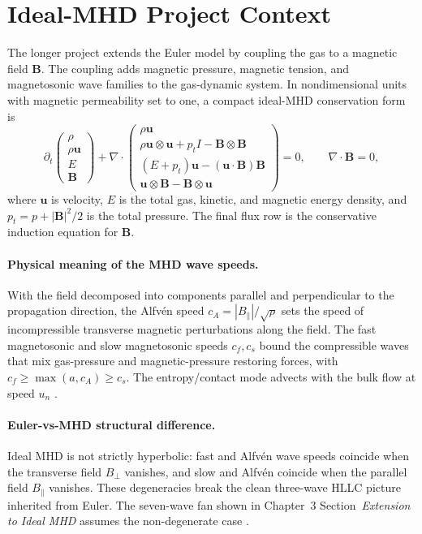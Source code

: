 \section{Ideal-MHD Project Context}
The longer project extends the Euler model by coupling the gas to a magnetic
field \(\mathbf{B}\). The coupling adds magnetic pressure, magnetic tension, and
magnetosonic wave families to the gas-dynamic system. In nondimensional units
with magnetic permeability set to one, a compact ideal-MHD conservation form is
\begin{equation}
  \partial_t
  \begin{pmatrix}
    \rho\\ \rho\mathbf{u}\\ E\\ \mathbf{B}
  \end{pmatrix}
  +
  \nabla\cdot
  \begin{pmatrix}
    \rho\mathbf{u}\\
    \rho\mathbf{u}\otimes\mathbf{u}
      + p_t I - \mathbf{B}\otimes\mathbf{B}\\
    (E+p_t)\mathbf{u}-(\mathbf{u}\cdot\mathbf{B})\mathbf{B}\\
    \mathbf{u}\otimes\mathbf{B}-\mathbf{B}\otimes\mathbf{u}
  \end{pmatrix}
  =0,
  \qquad
  \nabla\cdot\mathbf{B}=0,
\end{equation}
where \(\mathbf{u}\) is velocity, \(E\) is the total gas, kinetic, and magnetic
energy density, and \(p_t=p+\lvert\mathbf{B}\rvert^2/2\) is the total pressure.
The final flux row is the conservative induction equation for \(\mathbf{B}\).
\paragraph{Physical meaning of the MHD wave speeds.}
With the field decomposed into components parallel and perpendicular to the propagation direction, the Alfv\'en speed $c_A = |B_\parallel|/\sqrt{\rho}$ sets the speed of incompressible transverse magnetic perturbations along the field. The fast magnetosonic and slow magnetosonic speeds $c_f, c_s$ bound the compressible waves that mix gas-pressure and magnetic-pressure restoring forces, with $c_f \ge \max(a, c_A) \ge c_s$. The entropy/contact mode advects with the bulk flow at speed $u_n$ \citep{toro2009,miyoshi_kusano_2005}.

\paragraph{Euler-vs-MHD structural difference.}
Ideal MHD is not strictly hyperbolic: fast and Alfv\'en wave speeds coincide when the transverse field $B_\perp$ vanishes, and slow and Alfv\'en coincide when the parallel field $B_\parallel$ vanishes. These degeneracies break the clean three-wave HLLC picture inherited from Euler. The seven-wave fan shown in Chapter~3 Section~\emph{Extension to Ideal MHD} assumes the non-degenerate case \citep{brio_wu_1988}.

